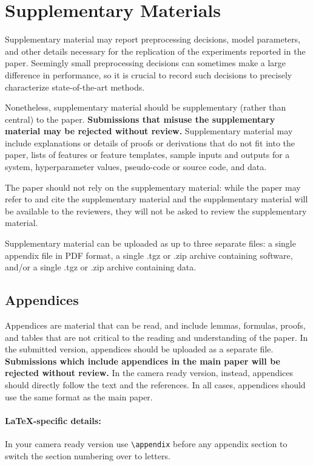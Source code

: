 \documentclass[11pt,a4paper]{article}
\begin{document}
	
	\section{Supplementary Materials}
	\label{sec:supplementary}
	
	Supplementary material may report preprocessing decisions, model parameters, and other details necessary for the replication of the experiments reported in the paper.
	Seemingly small preprocessing decisions can sometimes make a large difference in performance, so it is crucial to record such decisions to precisely characterize state-of-the-art methods. 
	
	Nonetheless, supplementary material should be supplementary (rather than central) to the paper.
	\textbf{Submissions that misuse the supplementary material may be rejected without review.}
	Supplementary material may include explanations or details of proofs or derivations that do not fit into the paper, lists of
	features or feature templates, sample inputs and outputs for a system, hyperparameter values, pseudo-code or source code, and data.
	
	The paper should not rely on the supplementary material: while the paper may refer to and cite the supplementary material and the supplementary material will be available to the reviewers, they will not be asked to review the supplementary material.
	
	Supplementary material can be uploaded as up to three separate files: a single appendix file in PDF format, a single .tgz or .zip archive containing software, and/or a single .tgz or .zip archive containing data.
	
	
	
	\subsection{Appendices}
	\label{sec:appendix}
	Appendices are material that can be read, and include lemmas, formulas, proofs, and tables that are not critical to the reading and understanding of the paper. 
	In the submitted version, appendices should be uploaded as a separate file. \textbf{Submissions which include appendices in the main paper will be rejected without review.} In the camera ready version, instead, appendices should directly follow the text and the references. In all cases, appendices should use the same format as the main paper. 
	
	\paragraph{\LaTeX-specific details:}
	In your camera ready version use {\small\verb|\appendix|} before any appendix section to switch the section numbering over to letters.
	
\end{document}
